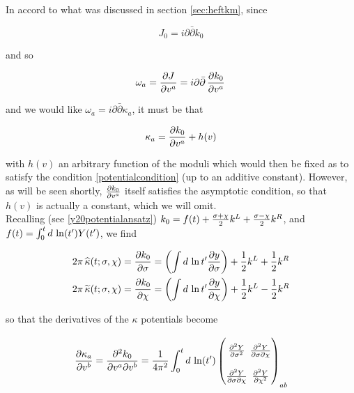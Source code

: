 In accord to what was discussed in section \ref{sec:heftkm}, since 

\begin{equation}
J_0 =  i \partial\bar \partial k_0
\end{equation}

and so

\begin{equation}
	\omega_a = \frac{\partial J}{\partial v^a} = i \partial \bar \partial \,\frac{\partial k_0}{\partial v^a}\,
	\label{}
\end{equation}

and we would like $\omega_a = i \partial\bar \partial \kappa_a$, it must be that 

\begin{equation}
\kappa_a = \frac{\partial k_0}{\partial v^a} + h(v)
\end{equation}

with $h(v)$ an arbitrary function of the moduli which would then be fixed as to satisfy the condition \eqref{potentialcondition} (up to an additive constant). However, as will be seen shortly, $\frac{\partial k_0}{\partial v^a}$ itself satisfies the asymptotic condition, so that $h(v)$ is actually a constant, which we will omit.\\

Recalling (see \eqref{y20potentialansatz}) $k_0 = f(t) + \frac{\sigma+\chi}{2} k^L + \frac{\sigma-\chi}{2} k^R$, and $f(t) = \int_0^t d \, \ln(t') Y(t')$, we find

\begin{align}
 	2\pi \, \widehat{\kappa}(t;\sigma,\chi) =	\frac{\partial k_0}{\partial\sigma} & = \left( \int d\, \ln t' \frac{\partial y}{\partial\sigma} \right) + \frac{1}2 k^L + \frac{1}2 k^R \\
	2\pi \, \widetilde{\kappa}(t;\sigma,\chi) =  \frac{\partial k_0}{\partial\chi} & = \left( \int d\, \ln t' \frac{\partial y}{\partial\chi} \right) + \frac{1}2 k^L - \frac{1}2 k^R
	\label{}
\end{align}


so that the derivatives of the $\kappa$ potentials become

\begin{equation}
\arraycolsep=1.4pt\def\arraystretch{2.2}
\pder{\kappa_a}{v^b} = \frac{\partial^2 k_0}{\partial v^a \partial v^b} = \frac{1}{4 \pi^2} \int_0^t d\, \ln(t')
	\begin{pmatrix}
		\frac{\partial^2 \y}{\partial \sigma^2} & \frac{\partial^2 \y}{\partial \sigma \partial \elta} \\
		\frac{\partial^2 \y}{\partial \sigma\partial \elta} & \frac{\partial^2 \y}{\partial \elta^2}
	\end{pmatrix}_{ab}
	\label{}
\end{equation}

